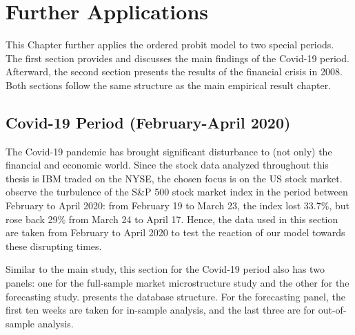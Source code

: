 \chapter{Further Applications}\label{chap:extension}

This Chapter further applies the ordered probit model to two special periods. The first section provides and discusses the main findings of the Covid-19 period. Afterward, the second section presents the results of the financial crisis in 2008. Both sections follow the same structure as the main empirical result chapter.


\section{Covid-19 Period (February-April 2020)}

The Covid-19 pandemic has brought significant disturbance to (not only) the financial and economic world. Since the stock data analyzed throughout this thesis is IBM traded on the NYSE, the chosen focus is on the US stock market. \citet{coxetal2020} observe the turbulence of the S\&P 500 stock market index in the period between February to April 2020: from February 19 to March 23, the index lost 33.7\%, but rose back 29\% from March 24 to April 17. Hence, the data used in this section are taken from February to April 2020 to test the reaction of our model towards these disrupting times.


Similar to the main study, this section for the Covid-19 period also has two panels: one for the full-sample market microstructure study and the other for the forecasting study.  presents the database structure. For the forecasting panel, the first ten weeks are taken for in-sample analysis, and the last three are for out-of-sample analysis.

\begin{table}[ht]
\centering
\small
\renewcommand{\arraystretch}{1.3} %
\setlength{\tabcolsep}{10pt} %
\caption{Summary of Database: IBM traded on NYSE (February-April 2020).}
\label{tab:table-12}
\end{table}


